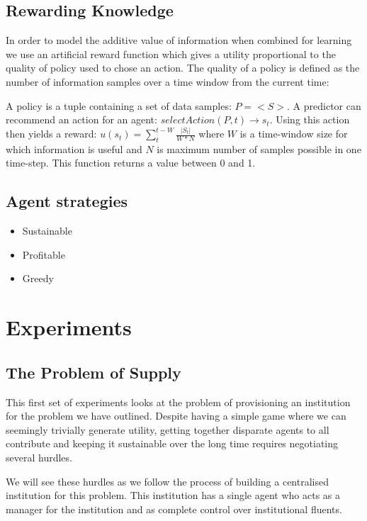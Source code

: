 \subsection{Rewarding Knowledge}

In order to model the additive value of information when combined for learning we use an artificial reward function which gives a utility proportional to the quality of policy used to chose an action. The quality of a policy is defined as the number of information samples over a time window from the current time:

A policy is a tuple containing a set of data samples: $P = <S>$. A predictor can recommend an action for an agent: $\mathit{selectAction}(P,t) \rightarrow s_t$. Using this action then yields a reward: $u(s_t) = \sum_t^{t-W} \frac{|S_t|}{W*N}$ where $W$ is a time-window size for which information is useful and $N$ is maximum number of samples possible in one time-step. This function returns a value between 0 and 1.

\subsection{Agent strategies}

\begin{itemize}
\item Sustainable
\item Profitable
\item Greedy
\end{itemize}

\section{Experiments}

\subsection{The Problem of Supply}\label{sec:supply}

This first set of experiments looks at the problem of provisioning an institution for the problem we have outlined. Despite having a simple game where we can seemingly trivially generate utility, getting together disparate agents to all contribute and keeping it sustainable over the long time requires negotiating several hurdles. 

We will see these hurdles as we follow the process of building a centralised institution for this problem. This institution has a single agent who acts as a manager for the institution and as complete control over institutional fluents.

